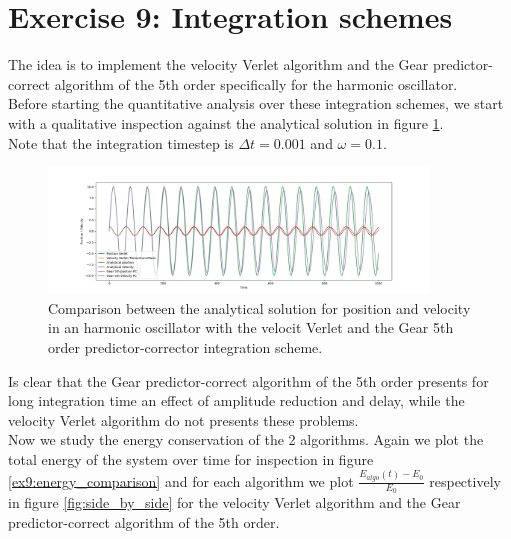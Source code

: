 \chapter*{Exercise 9: Integration schemes}

The idea is to implement the velocity Verlet algorithm and the Gear predictor-correct algorithm of the 5th order specifically for the harmonic oscillator. \\
Before starting the quantitative analysis over these integration schemes, we start with a qualitative inspection against the analytical solution in figure \ref{ex9:schemes_comparison}. \\
Note that the integration timestep is $\Delta t = 0.001$ and $\omega = 0.1$.

\begin{figure}[H]
    \centering
    \includegraphics[width=0.9\textwidth]{FIG/ex9/integration_schemes_comparison.png}
    \caption{Comparison between the analytical solution for position and velocity in an harmonic oscillator with the velocit Verlet and the Gear 5th order predictor-corrector integration scheme.}
    \label{ex9:schemes_comparison}
\end{figure}

Is clear that the Gear predictor-correct algorithm of the 5th order presents for long integration time an effect of amplitude reduction and delay, while the velocity Verlet algorithm do not presents these problems. \\
Now we study the energy conservation of the 2 algorithms. Again we plot the total energy of the system over time for inspection in figure \ref{ex9:energy_comparison} and for each algorithm we plot $\frac{E_{algo}(t) - E_0}{E_0}$ respectively in figure \ref{fig:side_by_side} for the velocity Verlet algorithm and the Gear predictor-correct algorithm of the 5th order. 

